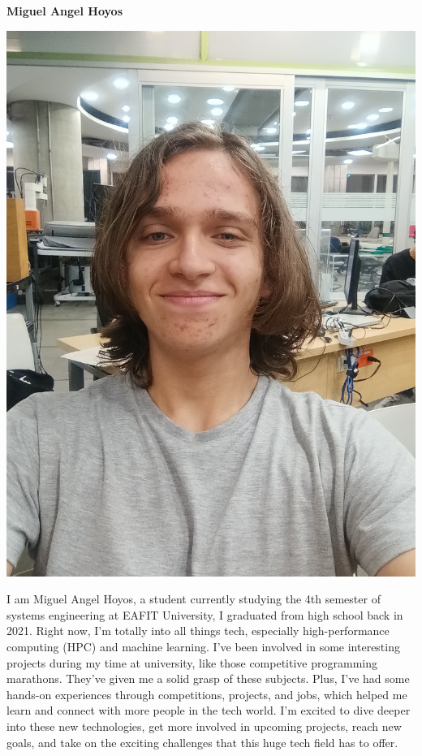 \documentclass[11pt,a4paper,twocolumn]{article}
\begin{document}
\begin{center}
    \textbf{Miguel Angel Hoyos}
\end{center}
\begin{center}
    \includegraphics[width = .45\linewidth]{images/Miguel Hoyos.jpeg}
\end{center}
I am Miguel Angel Hoyos, a student currently studying the 4th semester of systems engineering at EAFIT University, I graduated from high school back in 2021. Right now, I'm totally into all things tech, especially high-performance computing (HPC) and machine learning. I've been involved in some interesting projects during my time at university, like those competitive programming marathons. They've given me a solid grasp of these subjects. Plus, I've had some hands-on experiences through competitions, projects, and jobs, which helped me learn and connect with more people in the tech world. I'm excited to dive deeper into these new technologies, get more involved in upcoming projects, reach new goals, and take on the exciting challenges that this huge tech field has to offer.
\end{document}
